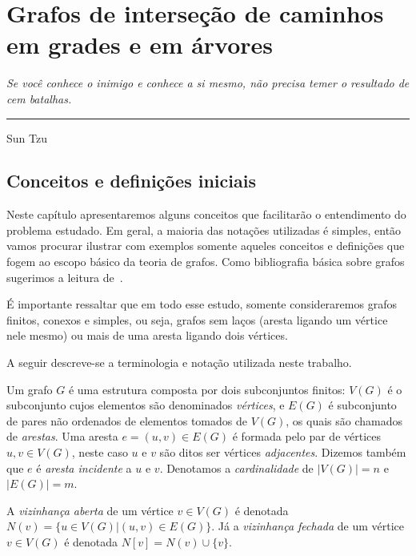 \chapter{Grafos de interseção de caminhos em grades e em árvores}\label{Notions}


\begin{flushright}
\begin{minipage}[t][0cm][b]{0.47\textwidth}
\emph{Se você conhece o inimigo e conhece a si mesmo, não precisa temer o resultado de cem batalhas. }
\end{minipage}

\rule[0cm]{7cm}{0.03cm}%

Sun Tzu
\end{flushright}

\section{Conceitos e definições iniciais}

Neste capítulo apresentaremos alguns conceitos que facilitarão o entendimento do problema estudado. Em geral, a maioria das notações utilizadas é simples, então vamos procurar ilustrar com exemplos somente aqueles conceitos e definições que fogem ao escopo básico da teoria de grafos. Como bibliografia básica sobre grafos sugerimos a leitura de~\cite{jayme2018}.

É importante ressaltar que em todo esse estudo, somente consideraremos grafos finitos, conexos e simples, ou seja, grafos sem
laços (aresta ligando um vértice nele mesmo) ou mais de uma aresta ligando dois
vértices.

A seguir descreve-se a terminologia e notação utilizada neste trabalho.

Um grafo $G$ é uma estrutura composta por dois subconjuntos finitos: $V(G)$ é o subconjunto cujos elementos são denominados \emph{vértices}, e $E(G)$ é subconjunto de pares não ordenados de elementos tomados de $V(G)$, os quais são chamados de \emph{arestas}. Uma aresta $e = (u,v)\in E(G)$ é formada pelo par de vértices $u,v \in V(G)$, neste caso $u$ e $v$ são ditos ser vértices \emph{adjacentes}. Dizemos também que  $e$ é \emph{aresta incidente} a $u$ e $v$. Denotamos a \emph{cardinalidade} de $|V(G)| = n$ e $|E(G)| = m$.

A \emph{vizinhança aberta} de um vértice $v\in V(G)$ é denotada $N(v) = \{u\in V(G) | (u,v) \in E(G)\}$. Já a \emph{vizinhança fechada} de um vértice $v\in V(G)$ é denotada $N[v] = N(v) \cup \{v\}$. 

